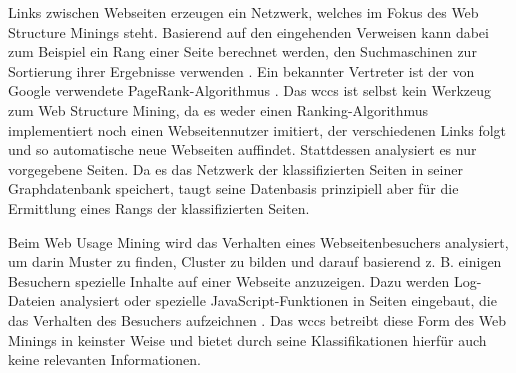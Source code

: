        Links zwischen Webseiten erzeugen ein Netzwerk,
        welches im Fokus des Web Structure Minings steht.
        Basierend auf den eingehenden Verweisen kann dabei zum Beispiel
        ein Rang einer Seite berechnet werden,
        den Suchmaschinen zur Sortierung ihrer Ergebnisse verwenden
        \cite[Part I]{markov:webMining}.
        Ein bekannter Vertreter ist der von Google verwendete PageRank-Algorithmus
        \cite{page:pageRank}.
        Das \gls{wccs} ist selbst kein Werkzeug zum Web Structure Mining,
        da es weder einen Ranking-Algorithmus implementiert
        noch einen Webseitennutzer imitiert, der verschiedenen Links folgt
        und so automatische neue Webseiten auffindet.
        Stattdessen analysiert es nur vorgegebene Seiten.
        Da es das Netzwerk der klassifizierten Seiten in seiner Graphdatenbank speichert,
        taugt seine Datenbasis prinzipiell aber für die Ermittlung eines Rangs
        der klassifizierten Seiten.

        Beim Web Usage Mining wird das Verhalten eines Webseitenbesuchers analysiert,
        um darin Muster zu finden, Cluster zu bilden und darauf basierend z. B.
        einigen Besuchern spezielle Inhalte auf einer Webseite anzuzeigen.
        Dazu werden Log-Dateien analysiert oder spezielle JavaScript-Funktionen
        in Seiten eingebaut, die das Verhalten des Besuchers aufzeichnen
        \cite[Part III]{markov:webMining}.
        Das \gls{wccs} betreibt diese Form des Web Minings in keinster Weise
        und bietet durch seine Klassifikationen hierfür auch keine relevanten Informationen.

